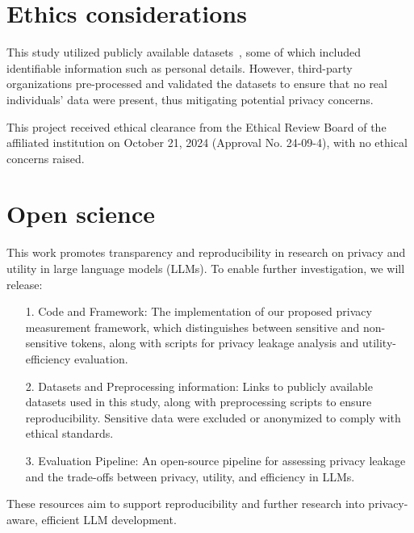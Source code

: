 \section{Ethics considerations}
\label{sec:ethics}

This study utilized publicly available datasets~\cite{shi-etal-2022-selective, pii}, some of which included identifiable information such as personal details. However, third-party organizations pre-processed and validated the datasets to ensure that no real individuals’ data were present, thus mitigating potential privacy concerns.

This project received ethical clearance from the Ethical Review Board of the affiliated institution on October 21, 2024 (Approval No. 24-09-4), with no ethical concerns raised.


\section{Open science}
\label{sec:openscience}
This work promotes transparency and reproducibility in research on privacy and utility in large language models (LLMs). To enable further investigation, we will release:
\begin{itemize}
    \item[1.] Code and Framework: The implementation of our proposed privacy measurement framework, which distinguishes between sensitive and non-sensitive tokens, along with scripts for privacy leakage analysis and utility-efficiency evaluation.
    \item[2.] Datasets and Preprocessing information: Links to publicly available datasets used in this study, along with preprocessing scripts to ensure reproducibility. Sensitive data were excluded or anonymized to comply with ethical standards.
    \item [3.] Evaluation Pipeline: An open-source pipeline for assessing privacy leakage and the trade-offs between privacy, utility, and efficiency in LLMs. 
\end{itemize}

These resources aim to support reproducibility and further research into privacy-aware, efficient LLM development.